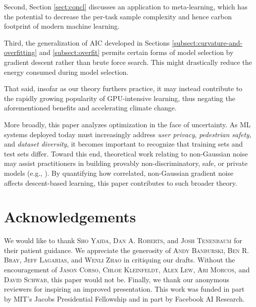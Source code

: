 \documentclass{article}
\theoremstyle{plain}
\theoremstyle{definition}
\begin{document}
    Second, Section \ref{sect:concl} discusses an application to meta-learning,
    which has the potential to decrease the per-task sample complexity and
    hence carbon footprint of modern machine learning.
     
    Third, the generalization of AIC developed in  Sections
    \ref{subsect:curvature-and-overfitting} and \ref{subsect:overfit} permits
    certain forms of model selection by gradient descent rather than brute
    force search.  This might drastically reduce the energy consumed during
    model selection.

    That said, insofar as our theory furthers practice, it may instead
    contribute to the rapidly growing popularity of GPU-intensive learning,
    thus negating the aforementioned benefits and accelerating climate change.

    More broadly, this paper analyzes optimization in the face of uncertainty.
    As ML systems deployed today must increasingly address \emph{user privacy},
    \emph{pedestrian safety}, and \emph{dataset diversity}, it becomes
    important to recognize that training sets and test sets
    differ.  Toward this end, theoretical work relating to non-Gaussian noise
    may assist practitioners in building provably non-discriminatory, safe, or
    private models (e.g., \cite{dw06}).  By quantifying how correlated,
    non-Gaussian gradient noise affects descent-based learning, this paper
    contributes to such broader theory.


\section*{Acknowledgements}

        We would like to thank
            \textsc{Sho Yaida},
            \textsc{Dan A. Roberts}, and
            \textsc{Josh Tenenbaum}
        for
        their patient guidance.  We appreciate the generosity of
            \textsc{Andy Banburski},
            \textsc{Ben R. Bray},
            \textsc{Jeff Lagarias}, and
            \textsc{Wenli Zhao}
        in critiquing our drafts.
        Without the encouragement of
            \textsc{Jason Corso},
            \textsc{Chloe Kleinfeldt},
            \textsc{Alex Lew}, 
            \textsc{Ari Morcos}, and
            \textsc{David Schwab},
        this paper would not be.
        Finally, we thank our anonymous reviewers for inspiring an improved
        presentation.
        This work was funded in part by MIT's Jacobs Presidential Fellowship
        and in part by Facebook AI Research.
        
\end{document}
